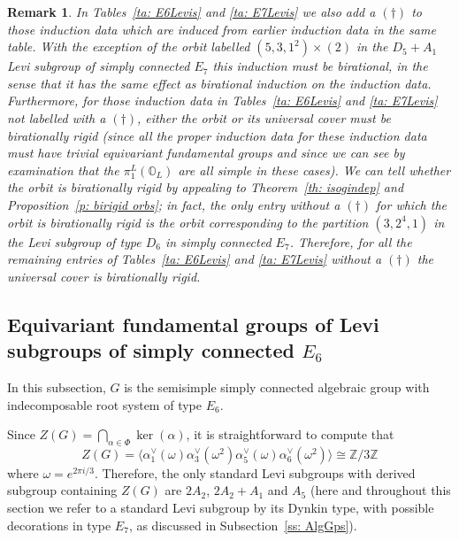 \documentclass[11pt]{amsart}
\renewcommand{\O}{{\mathbb O}}
\newcommand{\bZ}{{\mathbb Z}}
\newtheorem{rmk}{Remark}
\numberwithin{equation}{section}
\begin{document}
	\begin{rmk}\label{rmk: brid covs}
		In Tables~\ref{ta: E6Levis} and \ref{ta: E7Levis} we also add a $(\dagger)$ to those induction data which are induced from earlier induction data in the same table. With the exception of the orbit labelled $(5,3,1^2)\times (2)$ in the $D_5+A_1$ Levi subgroup of simply connected $E_7$ this induction must be birational, in the sense that it has the same effect as birational induction on the induction data. Furthermore, for those induction data in Tables~\ref{ta: E6Levis} and \ref{ta: E7Levis} not labelled with a $(\dagger)$, either the orbit or its universal cover must be birationally rigid (since all the proper induction data for these induction data must have trivial equivariant fundamental groups and since we can see by examination that the $\pi_1^L(\O_L)$ are all simple in these cases). We can tell whether the orbit is birationally rigid by appealing to Theorem~\ref{th: isogindep} and Proposition~\ref{p: birigid orbs}; in fact, the only entry without a $(\dagger)$ for which the orbit is birationally rigid is the orbit corresponding to the partition $(3,2^4,1)$ in the Levi subgroup of type $D_6$ in simply connected $E_7$. Therefore, for all the remaining entries of Tables~\ref{ta: E6Levis} and \ref{ta: E7Levis} without a $(\dagger)$ the universal cover is birationally rigid.
	\end{rmk}
	
	
	\subsection{Equivariant fundamental groups of Levi subgroups of simply connected $E_6$}\label{ss: E6Funds}
	
	In this subsection, $G$ is the semisimple simply connected algebraic group with indecomposable root system of type $E_6$.
	
	Since $Z(G)=\bigcap_{\alpha\in\Phi}\ker(\alpha)$, it is straightforward to compute that $$Z(G)=\langle \alpha_1^\vee(\omega)\alpha_3^\vee(\omega^2)\alpha_5^\vee(\omega)\alpha_6^\vee(\omega^2) \rangle\cong \bZ/3\bZ$$ where $\omega=e^{2\pi i/3}$. Therefore, the only standard Levi subgroups with derived subgroup containing $Z(G)$ are $2A_2$, $2A_2+A_1$ and $A_5$ (here and throughout this section we refer to a standard Levi subgroup by its Dynkin type, with possible decorations in type $E_7$, as discussed in Subsection~\ref{ss: AlgGps}).
	
\end{document}
